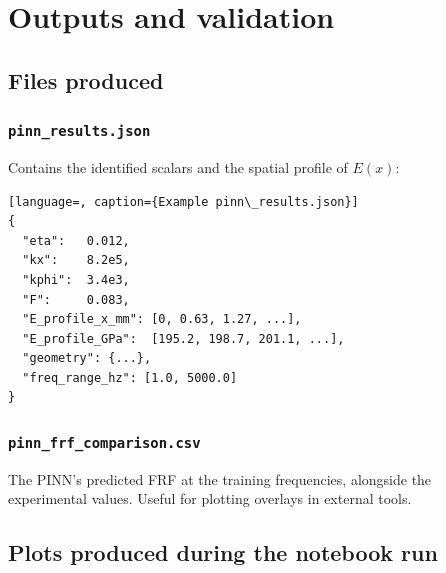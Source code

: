 \documentclass[11pt,a4paper]{article}
\begin{document}
\section{Outputs and validation}

\subsection{Files produced}

\subsubsection*{\texttt{pinn\_results.json}}

Contains the identified scalars and the spatial profile of $E(x)$:
\begin{lstlisting}[language=, caption={Example pinn\_results.json}]
{
  "eta":   0.012,
  "kx":    8.2e5,
  "kphi":  3.4e3,
  "F":     0.083,
  "E_profile_x_mm": [0, 0.63, 1.27, ...],
  "E_profile_GPa":  [195.2, 198.7, 201.1, ...],
  "geometry": {...},
  "freq_range_hz": [1.0, 5000.0]
}
\end{lstlisting}

\subsubsection*{\texttt{pinn\_frf\_comparison.csv}}

The PINN's predicted FRF at the training frequencies, alongside the experimental values. Useful for plotting overlays in external tools.

\subsection{Plots produced during the notebook run}
\end{document}
